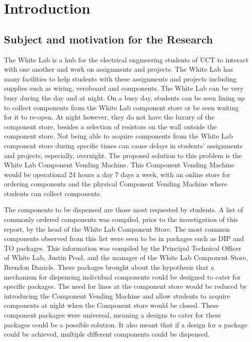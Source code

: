 \documentclass[a4paper,11pt]{article}
\numberwithin{figure}{section}
\numberwithin{table}{section}
\begin{document}
\pagestyle{mypage}
\section{Introduction}\thispagestyle{sectionstart}
	\subsection{Subject and motivation for the Research}
The White Lab is a hub for the electrical engineering students of UCT to interact with one another and work on assignments and projects. The White Lab has many facilities to help students with these assignments and projects including supplies such as wiring, veroboard and components. The White Lab can be very busy during the day and at night. On a busy day, students can be seen lining up to collect components from the White Lab component store or be seen waiting for it to re-open. At night however, they do not have the luxury of the component store, besides a selection of resistors on the wall outside the component store. Not being able to acquire components from the White Lab component store during specific times can cause delays in students' assignments and projects, especially, overnight. The proposed solution to this problem is the White Lab Component Vending Machine. This Component Vending Machine would be operational 24 hours a day 7 days a week, with an online store for ordering components and the physical Component Vending Machine where students can collect components. 

The components to be dispensed are those most requested by students. A list of commonly ordered components was compiled, prior to the investigation of this report, by the head of the White Lab Component Store. The most common components observed from this list were seen to be in packages such as DIP and TO packages. This information was compiled by the Principal Technical Officer of White Lab, Justin Pead, and the manager of the White Lab Component Store, Brendon Daniels. These packages brought about the hypothesis that a mechanism for dispensing individual components could be designed to cater for specific packages. The need for lines at the component store would be reduced by introducing the Component Vending Machine and allow students to acquire components at night when the Component store would be closed. These component packages were universal, meaning a designs to cater for these packages could be a possible solution. It also meant that if a design for a package could be achieved, multiple different components could be dispensed.
\end{document}
